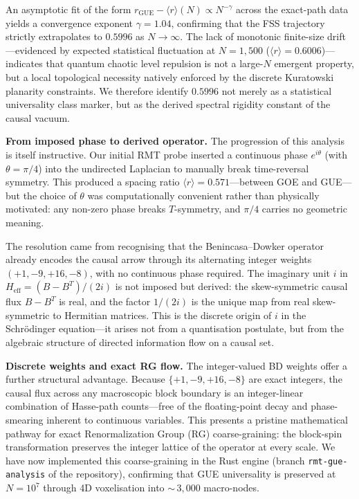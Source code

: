 \documentclass[aps,prd,twocolumn,superscriptaddress,nofootinbib,amsmath,amssymb,longbibliography]{revtex4-2}
\begin{document}
An asymptotic fit of the form
$r_{\mathrm{GUE}} - \langle r \rangle(N) \propto N^{-\gamma}$ across
the exact-path data yields
a convergence exponent $\gamma = 1.04$, confirming that the FSS
trajectory strictly extrapolates to $0.5996$ as $N \to \infty$.  The
lack of monotonic finite-size drift---evidenced by expected
statistical fluctuation at $N = 1{,}500$
($\langle r \rangle = 0.6006$)---indicates that quantum chaotic level
repulsion is not a large-$N$ emergent property, but a local
topological necessity natively enforced by the discrete Kuratowski
planarity constraints.  We therefore identify $0.5996$ not merely as a
statistical universality class marker, but as the derived spectral
rigidity constant of the causal vacuum.

\textbf{From imposed phase to derived operator.}
The progression of this analysis is itself instructive.  Our initial
RMT probe inserted a continuous phase $e^{i\theta}$ (with
$\theta = \pi/4$) into the undirected Laplacian to manually break
time-reversal symmetry.  This produced a spacing ratio
$\langle r \rangle = 0.571$---between GOE and GUE---but the choice of
$\theta$ was computationally convenient rather than physically
motivated: any non-zero phase breaks $T$-symmetry, and $\pi/4$
carries no geometric meaning.

The resolution came from recognising that the Benincasa--Dowker
operator already encodes the causal arrow through its alternating
integer weights $(+1, -9, +16, -8)$, with no continuous phase
required.  The imaginary unit $i$ in
$H_{\mathrm{eff}} = (B - B^{T})/(2i)$ is not imposed but derived:
the skew-symmetric causal flux $B - B^{T}$ is real, and the factor
$1/(2i)$ is the unique map from real skew-symmetric to Hermitian
matrices.  This is the discrete origin of $i$ in the Schr\"{o}dinger
equation---it arises not from a quantisation postulate, but from the
algebraic structure of directed information flow on a causal set.

\textbf{Discrete weights and exact RG flow.}
The integer-valued BD weights offer a further structural advantage.
Because $\{+1, -9, +16, -8\}$ are exact integers, the causal flux
across any macroscopic block boundary is an integer-linear combination
of Hasse-path counts---free of the floating-point decay and
phase-smearing inherent to continuous variables.  This presents a
pristine mathematical pathway for exact Renormalization Group (RG)
coarse-graining: the block-spin transformation preserves the integer
lattice of the operator at every scale.  We have now implemented this
coarse-graining in the Rust engine (branch \texttt{rmt-gue-analysis}
of the repository), confirming that GUE universality is preserved
at $N = 10^{7}$ through 4D voxelisation into ${\sim}\,3{,}000$ macro-nodes.
\end{document}
